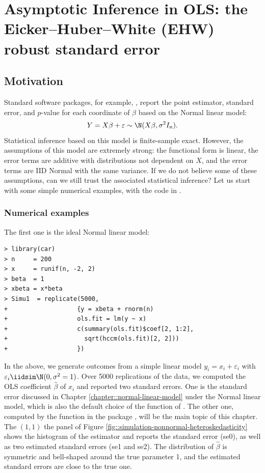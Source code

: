  
\chapter{Asymptotic Inference in OLS: the Eicker--Huber--White (EHW) robust standard error}\label{chapter::EHW}




\section{Motivation}
Standard software packages, for example, , report the point estimator,
standard error, and $p$-value for each coordinate of $\beta$ based
on the Normal linear model:
\[
Y=X\beta+\varepsilon\sim\N(X\beta,\sigma^{2}I_{n}).
\]
Statistical inference based on this model is finite-sample exact.
However, the assumptions of this model are extremely strong: the functional
form is linear, the error terms are additive with distributions not
dependent on $X$, and the error terms are IID Normal with the
same variance. If we do not believe some of these assumptions, can we still
trust the associated statistical inference? Let us start with some simple numerical examples, with the  code in . 


\subsection{Numerical examples}

The  first one is the ideal Normal linear model:

\begin{lstlisting}
> library(car)
> n     = 200
> x     = runif(n, -2, 2)
> beta  = 1
> xbeta = x*beta 
> Simu1  = replicate(5000,
+                   {y = xbeta + rnorm(n)
+                   ols.fit = lm(y ~ x)
+                   c(summary(ols.fit)$coef[2, 1:2],
+                     sqrt(hccm(ols.fit)[2, 2]))
+                   })
\end{lstlisting}

In the above, we generate outcomes from a simple linear model $y_i = x_i + \varepsilon_i$ with $\varepsilon_i\iidsim \N(0,\sigma^2=1)$. Over 5000 replications of the data, we computed the OLS coefficient $\hat{\beta}$ of $x_i$ and reported two standard errors. One is the standard error discussed in Chapter \ref{chapter::normal-linear-model} under the Normal linear model, which is also the default choice of the  function of . The other one, computed by the  function in the  package , will be the main topic of this chapter. The $(1,1)$ the panel of
Figure \ref{fig::simulation-nonnormal-heteroskedasticity} shows the histogram of the estimator and reports the standard error (se0), as well as two estimated standard errors (se1 and se2). The distribution of $\hat{\beta}$ is symmetric and bell-shaped around the true parameter 1, and the estimated standard errors are close to the true one. 

